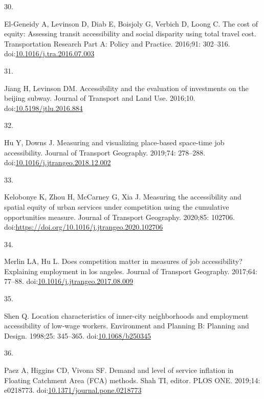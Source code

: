 \documentclass[10pt,letterpaper]{article}
\newlength{\cslhangindent}
\newlength{\csllabelwidth}
\newlength{\cslentryspacingunit} %
\newenvironment{CSLReferences}[2] %
 {%
  \setlength{\parindent}{0pt}
  \ifodd #1
  \let\oldpar\par
  \def\par{\hangindent=\cslhangindent\oldpar}
  \fi
  \setlength{\parskip}{#2\cslentryspacingunit}
 }%
 {}
\newcommand{\CSLLeftMargin}[1]{\parbox[t]{\csllabelwidth}{#1}}
\newcommand{\CSLRightInline}[1]{\parbox[t]{\linewidth - \csllabelwidth}{#1}\break}
\begin{document}
\begin{CSLReferences}{0}{0}
\leavevmode{}%
\CSLLeftMargin{30. }%
\CSLRightInline{El-Geneidy A, Levinson D, Diab E, Boisjoly G, Verbich D,
Loong C. The cost of equity: {Assessing} transit accessibility and
social disparity using total travel cost. Transportation Research Part
A: Policy and Practice. 2016;91: 302--316.
doi:\href{https://doi.org/10.1016/j.tra.2016.07.003}{10.1016/j.tra.2016.07.003}}

\leavevmode{}%
\CSLLeftMargin{31. }%
\CSLRightInline{Jiang H, Levinson DM. Accessibility and the evaluation
of investments on the beijing subway. Journal of Transport and Land Use.
2016;10.
doi:\href{https://doi.org/10.5198/jtlu.2016.884}{10.5198/jtlu.2016.884}}

\leavevmode{}%
\CSLLeftMargin{32. }%
\CSLRightInline{Hu Y, Downs J. Measuring and visualizing place-based
space-time job accessibility. Journal of Transport Geography. 2019;74:
278--288.
doi:\href{https://doi.org/10.1016/j.jtrangeo.2018.12.002}{10.1016/j.jtrangeo.2018.12.002}}

\leavevmode{}%
\CSLLeftMargin{33. }%
\CSLRightInline{Kelobonye K, Zhou H, McCarney G, Xia J. Measuring the
accessibility and spatial equity of urban services under competition
using the cumulative opportunities measure. Journal of Transport
Geography. 2020;85: 102706.
doi:\url{https://doi.org/10.1016/j.jtrangeo.2020.102706}}

\leavevmode{}%
\CSLLeftMargin{34. }%
\CSLRightInline{Merlin LA, Hu L. Does competition matter in measures of
job accessibility? Explaining employment in los angeles. Journal of
Transport Geography. 2017;64: 77--88.
doi:\href{https://doi.org/10.1016/j.jtrangeo.2017.08.009}{10.1016/j.jtrangeo.2017.08.009}}

\leavevmode{}%
\CSLLeftMargin{35. }%
\CSLRightInline{Shen Q. Location characteristics of inner-city
neighborhoods and employment accessibility of low-wage workers.
Environment and Planning B: Planning and Design. 1998;25: 345--365.
doi:\href{https://doi.org/10.1068/b250345}{10.1068/b250345}}

\leavevmode{}%
\CSLLeftMargin{36. }%
\CSLRightInline{Paez A, Higgins CD, Vivona SF. Demand and level of
service inflation in Floating Catchment Area (FCA) methods. Shah TI,
editor. PLOS ONE. 2019;14: e0218773.
doi:\href{https://doi.org/10.1371/journal.pone.0218773}{10.1371/journal.pone.0218773}}


\end{CSLReferences}
\end{document}
